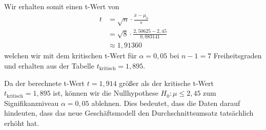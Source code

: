 \documentclass[main.tex]{subfiles}
\begin{document}
Wir erhalten somit einen t-Wert von $$\begin{aligned}
	t &= \sqrt{n}\cdot \frac{\overline{x}-\mu_0}{s} \\
	&= \sqrt{8} \cdot \frac{2,50625-2,45}{0,083141} \\
	&\approx 1,91360
\end{aligned}$$
welchen wir mit dem kritischen t-Wert für $\alpha=0,05$ bei $n - 1 =7$  Freiheitsgraden und erhalten aus der Tabelle $t_{\text{kritisch}} = 1,895$. 

Da der berechnete t-Wert $t = 1,914$ größer als der kritische t-Wert $t_{\text{kritisch}} = 1,895$ ist, können wir die Nullhypothese $H_0: \mu \leq 2,45$ zum Signifikanzniveau $\alpha = 0,05$ ablehnen. Dies bedeutet, dass die Daten darauf hindeuten, dass das neue Geschäftsmodell den Durchschnittsumsatz tatsächlich erhöht hat.
\end{document}
